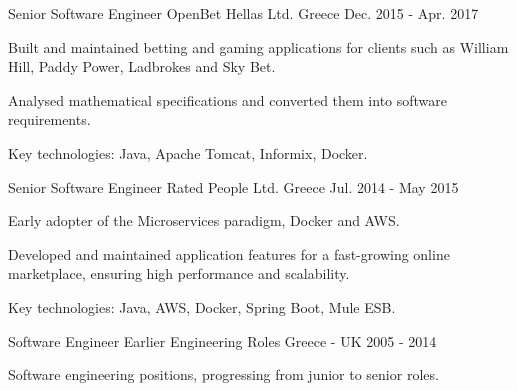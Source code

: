 \begin{cventries}
  \cventry
    {Senior Software Engineer} %
    {OpenBet Hellas Ltd.} %
    {Greece} %
    {Dec. 2015 - Apr. 2017} %
    {
      \begin{cvitems} %
        \item {Built and maintained betting and gaming applications for clients such as William Hill, Paddy Power, Ladbrokes and Sky Bet.}
        \item {Analysed mathematical specifications and converted them into software requirements.}
        \item {Key technologies: Java, Apache Tomcat, Informix, Docker.}
      \end{cvitems}
    }

  \cventry
    {Senior Software Engineer} %
    {Rated People Ltd.} %
    {Greece} %
    {Jul. 2014 - May 2015} %
    {
      \begin{cvitems} %
        \item {Early adopter of the Microservices paradigm, Docker and AWS.}
        \item {Developed and maintained application features for a fast-growing online marketplace, ensuring high performance and scalability.}
        \item {Key technologies: Java, AWS, Docker, Spring Boot, Mule ESB.}
      \end{cvitems}
    }

  \cventry
    {Software Engineer} %
    {Earlier Engineering Roles} %
    {Greece - UK} %
    {2005 - 2014} %
    {
      \begin{cvitems} %
        \item {Software engineering positions, progressing from junior to senior roles.}
      \end{cvitems}
    }

\end{cventries}
